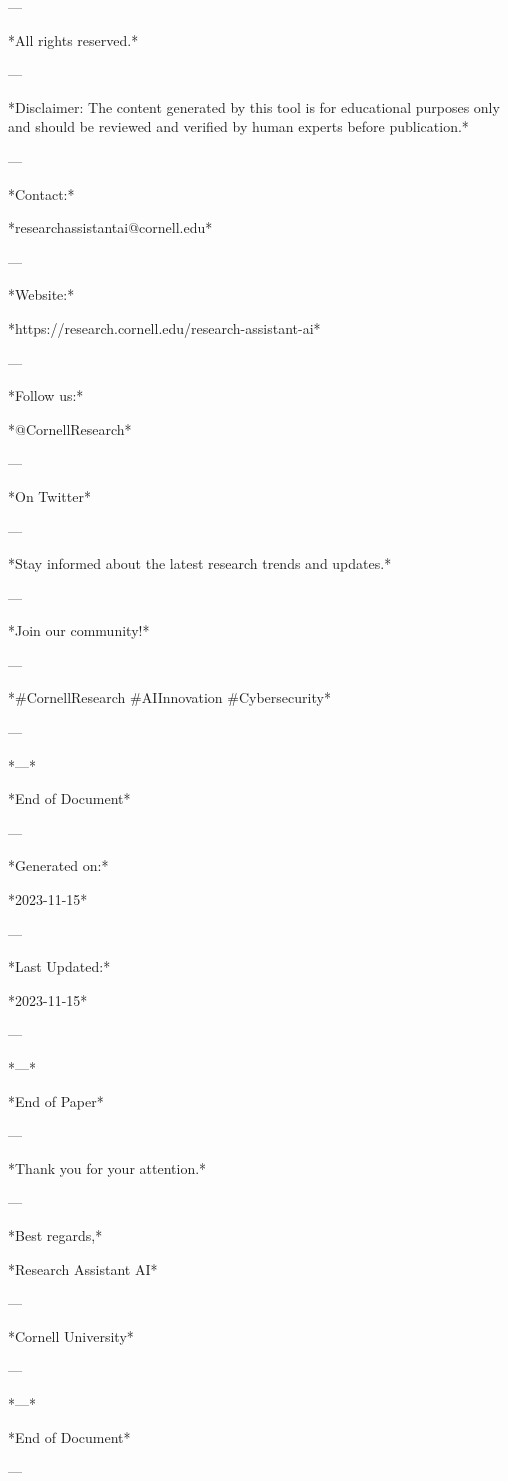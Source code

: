 --- 

*All rights reserved.* 

--- 

*Disclaimer: The content generated by this tool is for educational purposes only and should be reviewed and verified by human experts before publication.* 

--- 

*Contact:* 

*researchassistantai@cornell.edu* 

--- 

*Website:* 

*https://research.cornell.edu/research-assistant-ai* 

--- 

*Follow us:* 

*@CornellResearch* 

--- 

*On Twitter* 

--- 

*Stay informed about the latest research trends and updates.* 

--- 

*Join our community!* 

--- 

*#CornellResearch #AIInnovation #Cybersecurity* 

--- 

*---* 

*End of Document* 

--- 

*Generated on:* 

*2023-11-15* 

--- 

*Last Updated:* 

*2023-11-15* 

--- 

*---* 

*End of Paper* 

--- 

*Thank you for your attention.* 

--- 

*Best regards,* 

*Research Assistant AI* 

--- 

*Cornell University* 

--- 

*---* 

*End of Document* 

--- 

